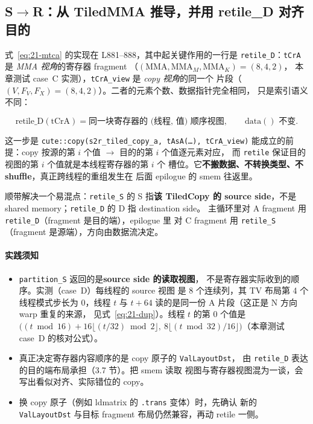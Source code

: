 \subsection{S$\to$R：从 TiledMMA 推导，并用 retile\_D 对齐目的}

\begin{sloppypar}
式~\eqref{eq:21-mtca} 的实现在 L881--888，其中起关键作用的一行是
\texttt{retile\_D}：\texttt{tCrA} 是 \emph{MMA 视角}的寄存器 fragment
（$(\mathrm{MMA}, \mathrm{MMA}_M, \mathrm{MMA}_K) = (8,4,2)$，
本章测试 case~C 实测），\texttt{tCrA\_view} 是 \emph{copy 视角}的同一个
片段（$(V, F_V, F_X) = (8,4,2)$）。二者的元素个数、数据指针完全相同，
只是索引语义不同：
\end{sloppypar}

\begin{equation}
  \mathrm{retile\_D}(\mathrm{tCrA}) = \text{同一块寄存器的
  (线程, 值) 顺序视图},\qquad \mathrm{data()} \text{ 不变} .
  \label{eq:21-retile-d}
\end{equation}

这一步是 \texttt{cute::\allowbreak{}copy\allowbreak{}(s2r\_\allowbreak{}tiled\_\allowbreak{}copy\_\allowbreak{}a,\allowbreak{} tAsA\allowbreak{}(\dots),\allowbreak{} tCrA\_\allowbreak{}view)}
能成立的前提：copy 按源的第 $i$ 个值 $\to$ 目的的第 $i$ 个值逐元素对应，
而 \texttt{retile} 保证目的视图的第 $i$ 个值就是本线程寄存器的第 $i$ 个
槽位。它\textbf{不搬数据、不转换类型、不 shuffle}，真正跨线程的重组发生在
后面 epilogue 的 smem 往返里。

顺带解决一个易混点：\texttt{retile\_S} 的 S 指\textbf{该 TiledCopy 的 source
side}，不是 shared memory；\texttt{retile\_D} 的 D 指 destination side。
主循环里对 A fragment 用 \texttt{retile\_D}（fragment 是目的端），epilogue 里
对 C fragment 用 \texttt{retile\_S}（fragment 是源端），方向由数据流决定。

\paragraph{实践须知}
\begin{itemize}
  \item \texttt{partition\_S} 返回的是\textbf{source side 的读取视图}，
        不是寄存器实际收到的顺序。实测（case~D）每线程的 source 视图
        是 8 个连续列，其 TV 布局第 4 个线程模式步长为 0，线程
        $t$ 与 $t+64$ 读的是同一份 A 片段（这正是 N 方向 warp 重复的来源，
        见式~\eqref{eq:21-dup}）。线程 $t$ 的第 0 个值是
        $\bigl((t\bmod 16) + 16\lfloor (t/32)\bmod 2\rfloor,\
        8\lfloor (t\bmod 32)/16\rfloor\bigr)$（本章测试 case~D 的核对公式）。
  \item 真正决定寄存器内容顺序的是 copy 原子的 \texttt{Val\allowbreak{}Layout\allowbreak{}Dst}，
        由 \texttt{retile\_D} 表达的目的端布局承担（3.7 节）。把 smem 读取
        视图与寄存器视图混为一谈，会写出看似对齐、实际错位的 copy。
  \item 换 copy 原子（例如 ldmatrix 的 \texttt{.trans} 变体）时，先确认
        新的 \texttt{Val\allowbreak{}Layout\allowbreak{}Dst} 与目标 fragment 布局仍然兼容，再动
        retile 一侧。
\end{itemize}

